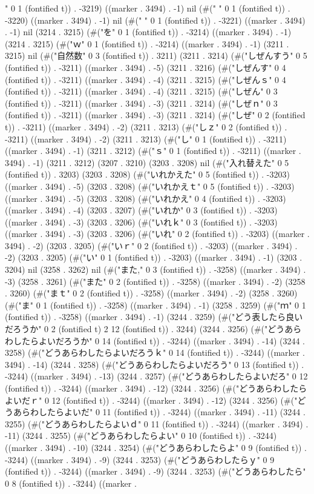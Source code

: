 " 0 1 (fontified t)) . -3219) ((marker . 3494) . -1) nil (#("	" 0 1 (fontified t)) . -3220) ((marker . 3494) . -1) nil (#(" " 0 1 (fontified t)) . -3221) ((marker . 3494) . -1) nil (3214 . 3215) (#("を" 0 1 (fontified t)) . -3214) ((marker . 3494) . -1) (3214 . 3215) (#("ｗ" 0 1 (fontified t)) . -3214) ((marker . 3494) . -1) (3211 . 3215) nil (#("自然数" 0 3 (fontified t)) . 3211) (3211 . 3214) (#("しぜんすう" 0 5 (fontified t)) . -3211) ((marker . 3494) . -5) (3211 . 3216) (#("しぜんす" 0 4 (fontified t)) . -3211) ((marker . 3494) . -4) (3211 . 3215) (#("しぜんｓ" 0 4 (fontified t)) . -3211) ((marker . 3494) . -4) (3211 . 3215) (#("しぜん" 0 3 (fontified t)) . -3211) ((marker . 3494) . -3) (3211 . 3214) (#("しぜｎ" 0 3 (fontified t)) . -3211) ((marker . 3494) . -3) (3211 . 3214) (#("しぜ" 0 2 (fontified t)) . -3211) ((marker . 3494) . -2) (3211 . 3213) (#("しｚ" 0 2 (fontified t)) . -3211) ((marker . 3494) . -2) (3211 . 3213) (#("し" 0 1 (fontified t)) . -3211) ((marker . 3494) . -1) (3211 . 3212) (#("ｓ" 0 1 (fontified t)) . -3211) ((marker . 3494) . -1) (3211 . 3212) (3207 . 3210) (3203 . 3208) nil (#("入れ替えた" 0 5 (fontified t)) . 3203) (3203 . 3208) (#("いれかえた" 0 5 (fontified t)) . -3203) ((marker . 3494) . -5) (3203 . 3208) (#("いれかえｔ" 0 5 (fontified t)) . -3203) ((marker . 3494) . -5) (3203 . 3208) (#("いれかえ" 0 4 (fontified t)) . -3203) ((marker . 3494) . -4) (3203 . 3207) (#("いれか" 0 3 (fontified t)) . -3203) ((marker . 3494) . -3) (3203 . 3206) (#("いれｋ" 0 3 (fontified t)) . -3203) ((marker . 3494) . -3) (3203 . 3206) (#("いれ" 0 2 (fontified t)) . -3203) ((marker . 3494) . -2) (3203 . 3205) (#("いｒ" 0 2 (fontified t)) . -3203) ((marker . 3494) . -2) (3203 . 3205) (#("い" 0 1 (fontified t)) . -3203) ((marker . 3494) . -1) (3203 . 3204) nil (3258 . 3262) nil (#("また," 0 3 (fontified t)) . -3258) ((marker . 3494) . -3) (3258 . 3261) (#("また" 0 2 (fontified t)) . -3258) ((marker . 3494) . -2) (3258 . 3260) (#("まｔ" 0 2 (fontified t)) . -3258) ((marker . 3494) . -2) (3258 . 3260) (#("ま" 0 1 (fontified t)) . -3258) ((marker . 3494) . -1) (3258 . 3259) (#("ｍ" 0 1 (fontified t)) . -3258) ((marker . 3494) . -1) (3244 . 3259) (#("どう表したら良いだろうか" 0 2 (fontified t) 2 12 (fontified t)) . 3244) (3244 . 3256) (#("どうあらわしたらよいだろうか" 0 14 (fontified t)) . -3244) ((marker . 3494) . -14) (3244 . 3258) (#("どうあらわしたらよいだろうｋ" 0 14 (fontified t)) . -3244) ((marker . 3494) . -14) (3244 . 3258) (#("どうあらわしたらよいだろう" 0 13 (fontified t)) . -3244) ((marker . 3494) . -13) (3244 . 3257) (#("どうあらわしたらよいだろ" 0 12 (fontified t)) . -3244) ((marker . 3494) . -12) (3244 . 3256) (#("どうあらわしたらよいだｒ" 0 12 (fontified t)) . -3244) ((marker . 3494) . -12) (3244 . 3256) (#("どうあらわしたらよいだ" 0 11 (fontified t)) . -3244) ((marker . 3494) . -11) (3244 . 3255) (#("どうあらわしたらよいｄ" 0 11 (fontified t)) . -3244) ((marker . 3494) . -11) (3244 . 3255) (#("どうあらわしたらよい" 0 10 (fontified t)) . -3244) ((marker . 3494) . -10) (3244 . 3254) (#("どうあらわしたらよ" 0 9 (fontified t)) . -3244) ((marker . 3494) . -9) (3244 . 3253) (#("どうあらわしたらｙ" 0 9 (fontified t)) . -3244) ((marker . 3494) . -9) (3244 . 3253) (#("どうあらわしたら" 0 8 (fontified t)) . -3244) ((marker . 